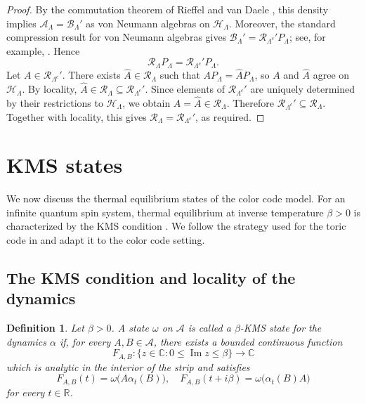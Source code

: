 \documentclass[a4paper,11pt]{article}
\newtheorem{definition}[theorem]{Definition}
\theoremstyle{definition}
\theoremstyle{remark}
\theoremstyle{remark}
\begin{document}
\begin{proof}
By the commutation theorem of Rieffel and van Daele \cite[Theorem~2]{rieffel1975commutation}, this density implies $\mathcal A_\Lambda=\mathcal B_\Lambda'$ as von Neumann algebras on $\mathcal H_\Lambda$. Moreover, the standard compression result for von Neumann algebras gives $\mathcal B_\Lambda'=\mathcal R_{\Lambda^c}'P_\Lambda$; see, for example, \cite[Proposition~II.3.10]{takesaki1979theory}. Hence
\[
    \mathcal R_\Lambda P_\Lambda=\mathcal R_{\Lambda^c}'P_\Lambda.
\]
Let $A\in\mathcal R_{\Lambda^c}'$. There exists $\widehat A\in\mathcal R_\Lambda$ such that $AP_\Lambda=\widehat A P_\Lambda$, so $A$ and $\widehat A$ agree on $\mathcal H_\Lambda$. By locality, $\widehat A\in\mathcal R_\Lambda\subseteq\mathcal R_{\Lambda^c}'$. Since elements of $\mathcal R_{\Lambda^c}'$ are uniquely determined by their restrictions to $\mathcal H_\Lambda$, we obtain $A=\widehat A\in\mathcal R_\Lambda$. Therefore $\mathcal R_{\Lambda^c}'\subseteq\mathcal R_\Lambda$. Together with locality, this gives $\mathcal R_\Lambda=\mathcal R_{\Lambda^c}'$, as required.
\end{proof}





\section{KMS states}\label{sec:KMS}

We now discuss the thermal equilibrium states of the color code model. For an infinite quantum spin system, thermal equilibrium at inverse temperature $\beta>0$ is characterized by the KMS condition \cite{kubo1957statistical,martin1959KMStheory,Haag1967KMS,bratteli1997operator}. We follow the strategy used for the toric code in \cite{alicki2007statistical} and adapt it to the color code setting. 



\subsection{The KMS condition and locality of the dynamics}


\begin{definition}\label{def:KMS}
    Let $\beta>0$. A state $\omega$ on $\mathcal A$ is called a $\beta$-KMS state for the dynamics $\alpha$ if, for every $A,B\in\mathcal A$, there exists a bounded continuous function
    \[
        F_{A,B}:\{z\in\mathbb C:0\leq\operatorname{Im}z\leq\beta\}\to \mathbb C
    \]
    which is analytic in the interior of the strip and satisfies
    \[
        F_{A,B}(t) =\omega\bigl(A\alpha_t(B)\bigr),\quad F_{A,B}(t+i\beta)=\omega\bigl(\alpha_t(B)A\bigr)
    \]
    for every $t\in\mathbb R$.
\end{definition}
\end{document}

